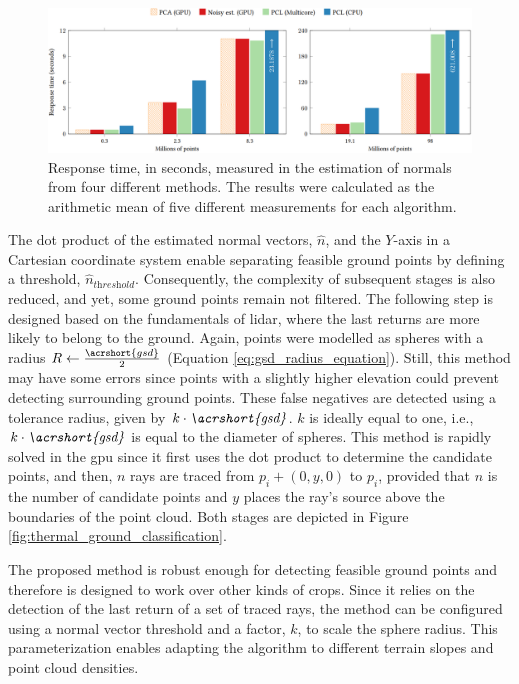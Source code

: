 \begin{figure}
    \centering
    \includegraphics[width=\linewidth]{figs/thermal_projection/response_time_normals.png}
    \caption{Response time, in seconds, measured in the estimation of normals from four different methods. The results were calculated as the arithmetic mean of five different measurements for each algorithm. }
	\label{fig:thermal_normal_response_time}
\end{figure}

The dot product of the estimated normal vectors, $\hat{n}$, and the $Y$-axis in a Cartesian coordinate system enable separating feasible ground points by defining a threshold, $\hat{n}_{\textit{threshold}}$. Consequently, the complexity of subsequent stages is also reduced, and yet, some ground points remain not filtered. The following step is designed based on the fundamentals of \acrshort{lidar}, where the last returns are more likely to belong to the ground. Again, points were modelled as spheres with a radius $R \gets \frac{\acrshort{gsd}}{2}$ (Equation \ref{eq:gsd_radius_equation}). Still, this method may have some errors since points with a slightly higher elevation could prevent detecting surrounding ground points. These false negatives are detected using a tolerance radius, given by $k \cdot \textit{\acrshort{gsd}}$. $k$ is ideally equal to one, i.e., $k \cdot \textit{\acrshort{gsd}}$ is equal to the diameter of spheres. This method is rapidly solved in the \acrshort{gpu} since it first uses the dot product to determine the candidate points, and then, $n$ rays are traced from $p_i + (0, y, 0)$ to $p_i$, provided that $n$ is the number of candidate points and $y$ places the ray's source above the boundaries of the point cloud. Both stages are depicted in Figure \ref{fig:thermal_ground_classification}. 

\begin{kaobox}[frametitle=Application of the proposed classification to other environments]
The proposed method is robust enough for detecting feasible ground points and therefore is designed to work over other kinds of crops. Since it relies on the detection of the last return of a set of traced rays, the method can be configured using a normal vector threshold and a factor, $k$, to scale the sphere radius. This parameterization enables adapting the algorithm to different terrain slopes and point cloud densities.
\end{kaobox}


